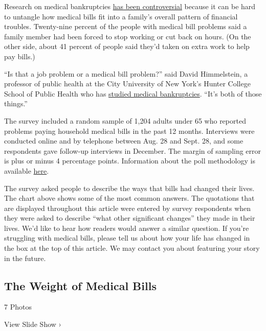 Research on medical bankruptcies
\href{http://content.healthaffairs.org/content/25/2/w89.full}{has been
controversial} because it can be hard to untangle how medical bills fit
into a family's overall pattern of financial troubles. Twenty-nine
percent of the people with medical bill problems said a family member
had been forced to stop working or cut back on hours. (On the other
side, about 41 percent of people said they'd taken on extra work to help
pay bills.)

``Is that a job problem or a medical bill problem?'' said David
Himmelstein, a professor of public health at the City University of New
York's Hunter College School of Public Health who has
\href{http://content.healthaffairs.org/content/suppl/2005/01/28/hlthaff.w5.63.DC1}{studied
medical bankruptcies}. ``It's both of those things.''

The survey included a random sample of 1,204 adults under 65 who
reported problems paying household medical bills in the past 12 months.
Interviews were conducted online and by telephone between Aug. 28 and
Sept. 28, and some respondents gave follow-up interviews in December.
The margin of sampling error is plus or minus 4 percentage points.
Information about the poll methodology is available
\href{http://www.nytimes.com/2016/01/06/upshot/how-the-poll-on-medical-bills-was-conducted.html}{here}.

The survey asked people to describe the ways that bills had changed
their lives. The chart above shows some of the most common answers. The
quotations that are displayed throughout this article were entered by
survey respondents when they were asked to describe ``what other
significant changes'' they made in their lives. We'd like to hear how
readers would answer a similar question. If you're struggling with
medical bills, please tell us about how your life has changed in the box
at the top of this article. We may contact you about featuring your
story in the future.

\href{https://www.nytimes.com/slideshow/2015/12/21/upshot/the-weight-of-medical-bills.html}{}

\hypertarget{the-weight-of-medical-bills}{%
\subsection{The Weight of Medical
Bills}\label{the-weight-of-medical-bills}}

7 Photos

View Slide Show ›

